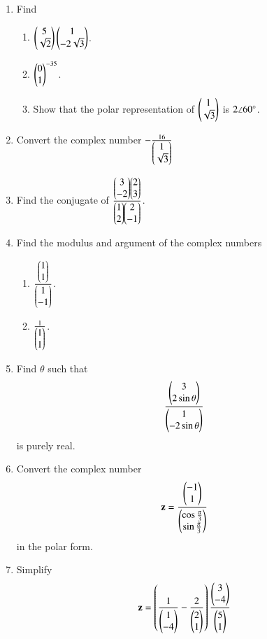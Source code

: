 \begin{enumerate}[label=\arabic*.,ref=\thesubsection.\theenumi]
\item Find 
\begin{enumerate}
\item $\begin{pmatrix}5\\ \sqrt{2}\end{pmatrix} \begin{pmatrix}1 \\ - 2\sqrt{3}\end{pmatrix}$.
\item $\begin{pmatrix}0 \\ 1\end{pmatrix}^{-35}$.
\item Show that the polar representation of $\begin{pmatrix}1\\\sqrt{3}\end{pmatrix}$ is $2\angle 60\degree$.
\end{enumerate}
\item Convert the complex number $-\frac{16}{\begin{pmatrix}1 \\ \sqrt{3}\end{pmatrix}}$
\item Find the conjugate of $\frac{\begin{pmatrix}3 \\ -2\end{pmatrix}\begin{pmatrix}2 \\ 3\end{pmatrix}}{\begin{pmatrix}1 \\ 2\end{pmatrix}\begin{pmatrix}2 \\ -1\end{pmatrix}}$.
\\
\solution

\item Find the modulus and argument of the complex numbers
\begin{enumerate}
\item $\frac{\begin{pmatrix}1\\1\end{pmatrix}}{\begin{pmatrix}1\\-1\end{pmatrix}}$.
\item $\frac{1}{\begin{pmatrix}1\\1\end{pmatrix}}$.
\end{enumerate}
\solution

\item Find $\theta$ such that 
\begin{align}
\frac{\begin{pmatrix}3\\2\sin\theta\end{pmatrix}}{\begin{pmatrix}1\\-2\sin\theta\end{pmatrix}}
\end{align}
%
is purely real.
\item Convert the complex number 
\begin{align}
\mathbf{z} = \frac{\begin{pmatrix}-1\\1\end{pmatrix}}{\begin{pmatrix}\cos \frac{\pi}{3}\\ \sin\frac{\pi}{3}\end{pmatrix}}
\end{align}
%
in the polar form.
%
\item Simplify 
%
\begin{align}
\vec{z} = \brak{\frac{1}{\myvec{1\\-4}} - \frac{2}{\myvec{2\\1}}}\frac{\myvec{3\\-4}}{\myvec{5\\1}} 

\end{align}
\end{enumerate}
